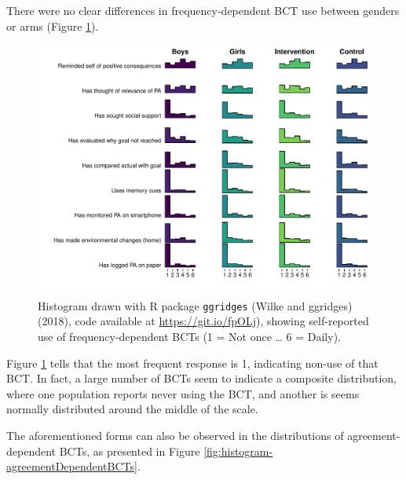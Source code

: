 \documentclass[british,man]{apa6}
\begin{document}
There were no clear differences in frequency-dependent BCT use between genders or arms (Figure \ref{fig:histogram-frequencyDependentBCTs}).

\begin{figure}
\centering
\includegraphics{_baseline-manuscript_files/figure-latex/histogram-frequencyDependentBCTs-1.pdf}
\caption{\label{fig:histogram-frequencyDependentBCTs}Histogram drawn with R package \texttt{ggridges} (Wilke and ggridges) (2018), code available at \url{https://git.io/fpOLj}), showing self-reported use of frequency-dependent BCTs (1 = Not once \ldots{} 6 = Daily).}
\end{figure}

Figure \ref{fig:histogram-frequencyDependentBCTs} tells that the most frequent response is 1, indicating non-use of that BCT. In fact, a large number of BCTs seem to indicate a composite distribution, where one population reports never using the BCT, and another is seems normally distributed around the middle of the scale.

The aforementioned forms can also be observed in the distributions of agreement-dependent BCTs, as presented in Figure \ref{fig:histogram-agreementDependentBCTs}.
\end{document}
